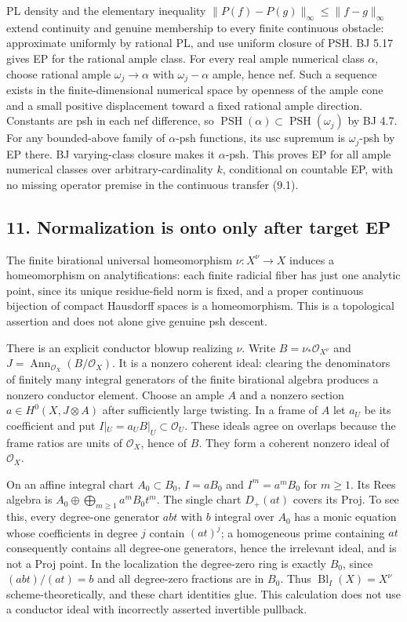 \documentclass[
  10pt,
]{article}
\begin{document}
PL density and the elementary inequality
\(\|P(f)-P(g)\|_\infty\le\|f-g\|_\infty\) extend continuity and genuine
membership to every finite continuous obstacle: approximate uniformly by
rational PL, and use uniform closure of PSH. BJ 5.17 gives EP for the
rational ample class. For every real ample numerical class \(\alpha\),
choose rational ample \(\omega_j\to\alpha\) with \(\omega_j-\alpha\)
ample, hence nef. Such a sequence exists in the finite-dimensional
numerical space by openness of the ample cone and a small positive
displacement toward a fixed rational ample direction. Constants are psh
in each nef difference, so
\(\operatorname{PSH}(\alpha)\subset\operatorname{PSH}(\omega_j)\) by BJ
4.7. For any bounded-above family of \(\alpha\)-psh functions, its usc
supremum is \(\omega_j\)-psh by EP there. BJ varying-class closure makes
it \(\alpha\)-psh. This proves EP for all ample numerical classes over
arbitrary-cardinality \(k\), conditional on countable EP, with no
missing operator premise in the continuous transfer (9.1).

\subsection{11. Normalization is onto only after target
EP}\label{normalization-is-onto-only-after-target-ep}

The finite birational universal homeomorphism \(\nu:X^\nu\to X\) induces
a homeomorphism on analytifications: each finite radicial fiber has just
one analytic point, since its unique residue-field norm is fixed, and a
proper continuous bijection of compact Hausdorff spaces is a
homeomorphism. This is a topological assertion and does not alone give
genuine psh descent.

There is an explicit conductor blowup realizing \(\nu\). Write
\(B=\nu_*\mathcal O_{X^\nu}\) and
\(J=\operatorname{Ann}_{\mathcal O_X}(B/\mathcal O_X)\). It is a nonzero
coherent ideal: clearing the denominators of finitely many integral
generators of the finite birational algebra produces a nonzero conductor
element. Choose an ample \(A\) and a nonzero section
\(a\in H^0(X,J\otimes A)\) after sufficiently large twisting. In a frame
of \(A\) let \(a_U\) be its coefficient and put
\(I|_U=a_UB|_U\subset\mathcal O_U\). These ideals agree on overlaps
because the frame ratios are units of \(\mathcal O_X\), hence of \(B\).
They form a coherent nonzero ideal of \(\mathcal O_X\).

On an affine integral chart \(A_0\subset B_0\), \(I=aB_0\) and
\(I^m=a^mB_0\) for \(m\ge1\). Its Rees algebra is
\(A_0\oplus\bigoplus_{m\ge1}a^mB_0t^m\). The single chart \(D_+(at)\)
covers its Proj. To see this, every degree-one generator \(abt\) with
\(b\) integral over \(A_0\) has a monic equation whose coefficients in
degree \(j\) contain \((at)^j\); a homogeneous prime containing \(at\)
consequently contains all degree-one generators, hence the irrelevant
ideal, and is not a Proj point. In the localization the degree-zero ring
is exactly \(B_0\), since \((abt)/(at)=b\) and all degree-zero fractions
are in \(B_0\). Thus \(\operatorname{Bl}_I(X)=X^\nu\)
scheme-theoretically, and these chart identities glue. This calculation
does not use a conductor ideal with incorrectly asserted invertible
pullback.
\end{document}
